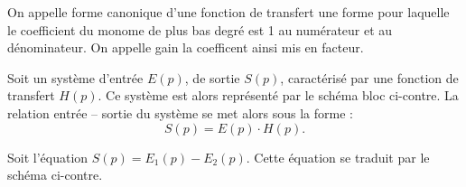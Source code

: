 

\begin{defi}
On appelle forme canonique d'une fonction de transfert une forme pour laquelle le coefficient du monome de plus bas degré est 1 au numérateur et au dénominateur. On appelle gain la coefficent ainsi mis en facteur.  
\end{defi}




\begin{marginfigure}[1.5cm]
\centering
{} 
\end{marginfigure}

\begin{defi}

Soit un système d'entrée $E(p)$, de sortie $S(p)$, caractérisé par une fonction
de transfert $H(p)$. Ce système est alors représenté par le schéma bloc ci-contre.
La relation entrée -- sortie du système se met alors sous la forme : 
$$
S(p) = E(p) \cdot H(p).
$$
\end{defi}

\newpage

\begin{marginfigure}[1cm]
\end{marginfigure}

\begin{defi}
Soit l'équation $S(p)=E_1(p)-E_2(p)$. Cette équation se traduit par le schéma ci-contre.
\end{defi}

